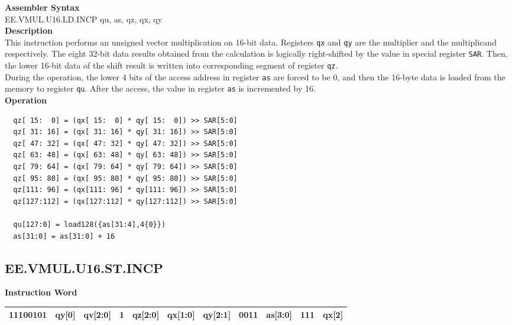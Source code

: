 \textbf{Assembler Syntax} \\
EE.VMUL.U16.LD.INCP qu, as, qz, qx, qy \\
\textbf{Description} \\
This instruction performs an unsigned vector multiplication on 16-bit data. Registers \lstinline{qx} and \lstinline{qy} are the multiplier and the multiplicand respectively. The eight 32-bit data results obtained from the calculation is logically right-shifted by the value in special register \lstinline{SAR}. Then, the lower 16-bit data of the shift result is written into corresponding segment of register \lstinline{qz}. \\ During the operation, the lower 4 bits of the access address in register \lstinline{as} are forced to be 0, and then the 16-byte data is loaded from the memory to register \lstinline{qu}. After the access, the value in register \lstinline{as} is incremented by 16.\\
\textbf{Operation}
\begin{lstlisting}
  qz[ 15:  0] = (qx[ 15:  0] * qy[ 15:  0]) >> SAR[5:0]
  qz[ 31: 16] = (qx[ 31: 16] * qy[ 31: 16]) >> SAR[5:0]
  qz[ 47: 32] = (qx[ 47: 32] * qy[ 47: 32]) >> SAR[5:0]
  qz[ 63: 48] = (qx[ 63: 48] * qy[ 63: 48]) >> SAR[5:0]
  qz[ 79: 64] = (qx[ 79: 64] * qy[ 79: 64]) >> SAR[5:0]
  qz[ 95: 80] = (qx[ 95: 80] * qy[ 95: 80]) >> SAR[5:0]
  qz[111: 96] = (qx[111: 96] * qy[111: 96]) >> SAR[5:0]
  qz[127:112] = (qx[127:112] * qy[127:112]) >> SAR[5:0]

  qu[127:0] = load128({as[31:4],4{0}})
  as[31:0] = as[31:0] + 16
\end{lstlisting}

\clearpage
\subsection{EE.VMUL.U16.ST.INCP}\label{instruction:EEVMULU16STINCP}
\setlength\tabcolsep{6pt}
\textbf{Instruction Word} \\
\begin{tabular}{|c|c|c|c|c|c|c|c|c|c|c|}
	\hline
	11100101 & qy[0] & qv[2:0] & 1 & qz[2:0] & qx[1:0] & qy[2:1] & 0011 & as[3:0] & 111 & qx[2] \\
	\hline
\end{tabular}

